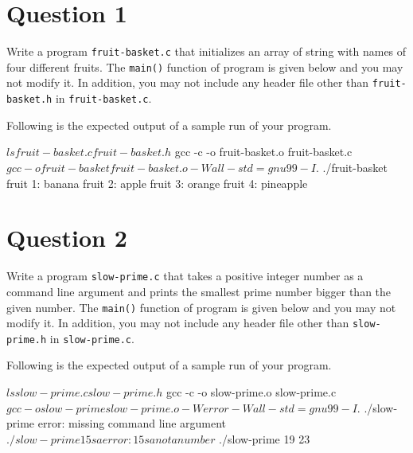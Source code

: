 \documentclass[12pt,letterpaper,twoside]{article}
\begin{document}


\section*{Question 1}

Write a program \texttt{fruit-basket.c} that initializes an array of string with names of four different fruits.
The \texttt{main()} function of program is given below and you may not modify it.
In addition, you may not include any header file other than \texttt{fruit-basket.h} in \texttt{fruit-basket.c}.

\lstset{language=c,tabsize=4}


Following is the expected output of a sample run of your program.

\begin{terminal}
$ ls
fruit-basket.c fruit-basket.h
$ gcc -c -o fruit-basket.o fruit-basket.c
$ gcc -o fruit-basket fruit-basket.o -Wall -std=gnu99 -I.
$ ./fruit-basket
fruit 1: banana
fruit 2: apple
fruit 3: orange
fruit 4: pineapple
\end{terminal}

\newpage

\section*{Question 2}

Write a program \texttt{slow-prime.c} that takes a positive integer number as a command line argument and prints the smallest prime number bigger than the given number.
The \texttt{main()} function of program is given below and you may not modify it.
In addition, you may not include any header file other than \texttt{slow-prime.h} in \texttt{slow-prime.c}.

\lstset{language=c,tabsize=4}


Following is the expected output of a sample run of your program.

\begin{terminal}
$ ls
slow-prime.c slow-prime.h
$ gcc -c -o slow-prime.o slow-prime.c
$ gcc -o slow-prime slow-prime.o -Werror -Wall -std=gnu99 -I.
$ ./slow-prime
error: missing command line argument
$ ./slow-prime 15sa
error: 15sa not a number
$ ./slow-prime 19
23
\end{terminal}
\end{document}
